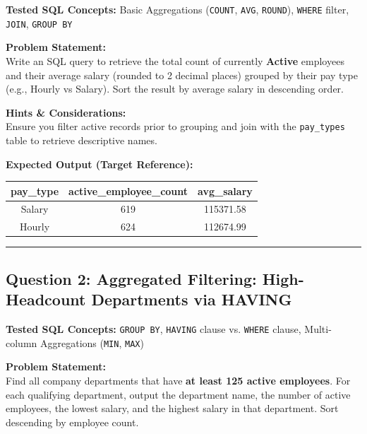 \documentclass[11pt,a4paper]{article}
\begin{document}
\noindent\textbf{Tested SQL Concepts:} Basic Aggregations (\texttt{COUNT}, \texttt{AVG}, \texttt{ROUND}), \texttt{WHERE} filter, \texttt{JOIN}, \texttt{GROUP BY}

\vspace{0.15cm}
\noindent\textbf{Problem Statement:} \\
Write an SQL query to retrieve the total count of currently \textbf{Active} employees and their average salary (rounded to 2 decimal places) grouped by their pay type (e.g., Hourly vs Salary). Sort the result by average salary in descending order.

\vspace{0.2cm}
\noindent\textbf{Hints \& Considerations:} \\
Ensure you filter active records prior to grouping and join with the \texttt{pay\_types} table to retrieve descriptive names.

\vspace{0.3cm}
\noindent\textbf{Expected Output (Target Reference):}
\begin{center}
\small
\begin{tabular}{ccc}
\toprule
\textbf{pay\_type} & \textbf{active\_employee\_count} & \textbf{avg\_salary} \\
\midrule
Salary & 619 & 115371.58 \\
Hourly & 624 & 112674.99 \\
\bottomrule
\end{tabular}
\end{center}

\vspace{0.4cm}
\noindent\rule{\textwidth}{0.4pt}
\vspace{0.4cm}

\subsection*{Question 2: Aggregated Filtering: High-Headcount Departments via HAVING}

\noindent\textbf{Tested SQL Concepts:} \texttt{GROUP BY}, \texttt{HAVING} clause vs. \texttt{WHERE} clause, Multi-column Aggregations (\texttt{MIN}, \texttt{MAX})

\vspace{0.15cm}
\noindent\textbf{Problem Statement:} \\
Find all company departments that have \textbf{at least 125 active employees}. For each qualifying department, output the department name, the number of active employees, the lowest salary, and the highest salary in that department. Sort descending by employee count.
\end{document}

